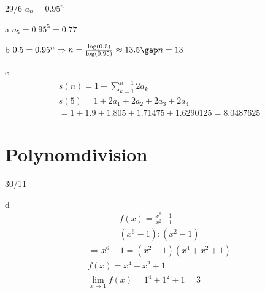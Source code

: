 \begin{exercise}{29/6}
  $a_n = 0.95^n$
  \item [a]
  $a_5 = 0.95^5 = 0.77$
  \item [b]
  $0.5 = 0.95^n \Rightarrow n = \frac{\log(0.5)}{\log(0.95)} \approx 13.5 \gap n = 13$
  \item [c]
  \begin{gather*}
    s(n) = 1 + \sum_{k = 1}^{n - 1} 2a_k \\
    s(5) = 1 + 2a_1 + 2a_2 + 2a_3 + 2a_4 \\ = 1 + 1.9 + 1.805 + 1.71475 + 1.6290125 = 8.0487625
  \end{gather*}
\end{exercise}
\section{Polynomdivision}
\begin{exercise}{30/11}
  \item [d]
  \begin{gather*}
    f(x) = \frac{x^6 - 1}{x^2 - 1} \\
    (x^6 - 1) : (x^2 - 1)
  \end{gather*}
  \begin{gather*}
    \Rightarrow x^6 - 1 = (x^2 - 1)(x^4 + x^2 + 1) \\
    f(x) = x^4 + x^2 + 1 \\
    \lim\limits_{x \to 1} f(x) = 1^4 + 1^2 + 1 = 3
  \end{gather*}
\end{exercise}
